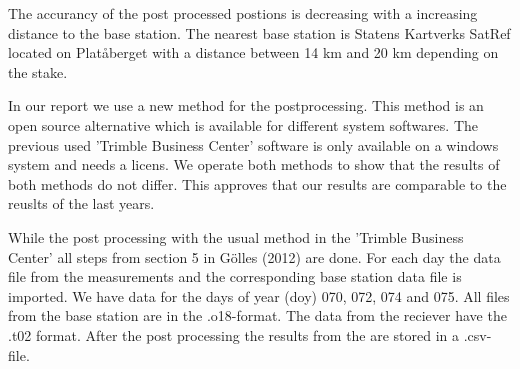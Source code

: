 
The accurancy of the post processed postions is decreasing with a increasing distance to the base station.
The nearest base station is Statens Kartverks SatRef located on Platåberget with a distance between 14 km and 20 km depending on the stake.\medskip

In our report we use a new method for the postprocessing. 
This method is an open source alternative which is available for different system softwares. 
The previous used 'Trimble Business Center' software is only available on a windows system and needs a licens. 
We operate both methods to show that the results of both methods do not differ.
This approves that our results are comparable to the reuslts of the last years.\medskip

While the post processing with the usual method in the 'Trimble Business Center' all steps from section 5 in Gölles (2012) are done.
For each day the data file from the measurements and the corresponding base station data file is imported. 
We have data for the days of year (doy) 070, 072, 074 and 075.
All files from the base station are in the .o18-format. 
The data from the reciever have the .t02 format. 
After the post processing the results from the are stored in a .csv-file.\medskip

